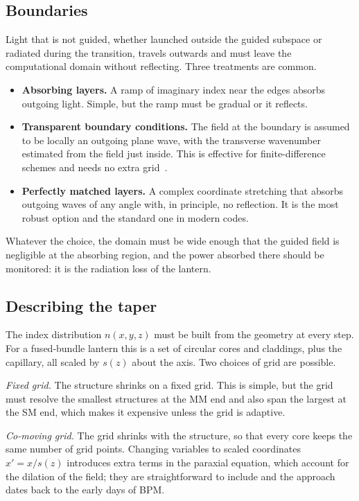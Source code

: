 \documentclass[11pt,a4paper]{article}
\begin{document}
\subsection{Boundaries}
Light that is not guided, whether launched outside the guided subspace or radiated during the transition, travels outwards and must leave the computational domain without reflecting. Three treatments are common.
\begin{itemize}
\item \textbf{Absorbing layers.} A ramp of imaginary index near the edges absorbs outgoing light. Simple, but the ramp must be gradual or it reflects.
\item \textbf{Transparent boundary conditions.} The field at the boundary is assumed to be locally an outgoing plane wave, with the transverse wavenumber estimated from the field just inside. This is effective for finite-difference schemes and needs no extra grid~\cite{Hadley1992TBC}.
\item \textbf{Perfectly matched layers.} A complex coordinate stretching that absorbs outgoing waves of any angle with, in principle, no reflection. It is the most robust option and the standard one in modern codes.
\end{itemize}
Whatever the choice, the domain must be wide enough that the guided field is negligible at the absorbing region, and the power absorbed there should be monitored: it is the radiation loss of the lantern.

\subsection{Describing the taper}
The index distribution $n(x,y,z)$ must be built from the geometry at every step. For a fused-bundle lantern this is a set of circular cores and claddings, plus the capillary, all scaled by $s(z)$ about the axis. Two choices of grid are possible.

\emph{Fixed grid.} The structure shrinks on a fixed grid. This is simple, but the grid must resolve the smallest structures at the MM end and also span the largest at the SM end, which makes it expensive unless the grid is adaptive.

\emph{Co-moving grid.} The grid shrinks with the structure, so that every core keeps the same number of grid points. Changing variables to scaled coordinates $x' = x/s(z)$ introduces extra terms in the paraxial equation, which account for the dilation of the field; they are straightforward to include and the approach dates back to the early days of BPM.
\end{document}
